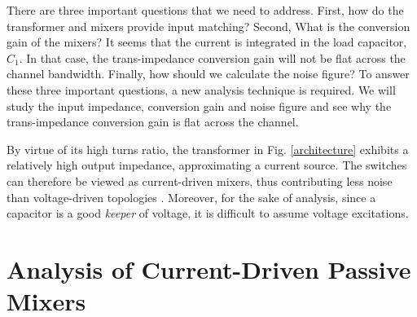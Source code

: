 There are three important questions that we need to address. First, how do the transformer and mixers provide input matching? Second, What is the
conversion gain of the mixers? It seems that the current is integrated in the load capacitor, $C_1$. In that case, the trans-impedance conversion gain
will not be flat across the channel bandwidth. Finally, how should we calculate the noise figure?
To answer these three important questions, a new analysis technique is required. We will study the input impedance, conversion gain and noise figure
and see why the trans-impedance conversion gain is flat across the channel.

By virtue of its high turns ratio, the transformer in Fig. \ref{architecture} exhibits a relatively high output impedance, approximating a current
source. The switches can therefore be viewed as current-driven mixers, thus contributing less noise than voltage-driven topologies \cite{Kaczman}.
Moreover, for the sake of analysis, since a capacitor is a good {\em keeper} of voltage, it is difficult to assume voltage excitations.




\section{Analysis of Current-Driven Passive Mixers} 

